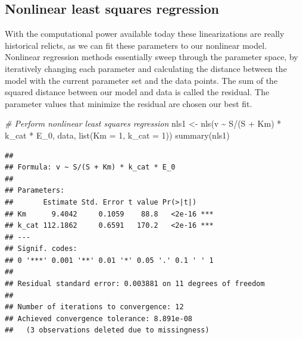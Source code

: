 \documentclass[
]{article}
\newenvironment{Shaded}{\begin{snugshade}}{\end{snugshade}}
\newcommand{\AttributeTok}[1]{\textcolor[rgb]{0.77,0.63,0.00}{#1}}
\newcommand{\CommentTok}[1]{\textcolor[rgb]{0.56,0.35,0.01}{\textit{#1}}}
\newcommand{\DecValTok}[1]{\textcolor[rgb]{0.00,0.00,0.81}{#1}}
\newcommand{\FunctionTok}[1]{\textcolor[rgb]{0.00,0.00,0.00}{#1}}
\newcommand{\NormalTok}[1]{#1}
\newcommand{\OtherTok}[1]{\textcolor[rgb]{0.56,0.35,0.01}{#1}}
\newcommand{\SpecialCharTok}[1]{\textcolor[rgb]{0.00,0.00,0.00}{#1}}
\begin{document}
\hypertarget{nonlinear-least-squares-regression}{%
\subsection{Nonlinear least squares regression}\label{nonlinear-least-squares-regression}}

With the computational power available today these linearizations are really historical relicts, as we can fit these parameters to our nonlinear model. Nonlinear regression methods essentially sweep through the parameter space, by iteratively changing each parameter and calculating the distance between the model with the current parameter set and the data points. The sum of the squared distance between our model and data is called the residual. The parameter values that minimize the residual are chosen our best fit.

\begin{Shaded}
\begin{Highlighting}[]
\CommentTok{\# Perform nonlinear least squares regression}
\NormalTok{nls1 }\OtherTok{\textless{}{-}} \FunctionTok{nls}\NormalTok{(v }\SpecialCharTok{\textasciitilde{}}\NormalTok{ S}\SpecialCharTok{/}\NormalTok{(S }\SpecialCharTok{+}\NormalTok{ Km) }\SpecialCharTok{*}\NormalTok{ k\_cat }\SpecialCharTok{*}\NormalTok{ E\_0, data, }\FunctionTok{list}\NormalTok{(}\AttributeTok{Km =} \DecValTok{1}\NormalTok{, }
    \AttributeTok{k\_cat =} \DecValTok{1}\NormalTok{))}
\FunctionTok{summary}\NormalTok{(nls1)}
\end{Highlighting}
\end{Shaded}

\begin{verbatim}
## 
## Formula: v ~ S/(S + Km) * k_cat * E_0
## 
## Parameters:
##       Estimate Std. Error t value Pr(>|t|)    
## Km      9.4042     0.1059    88.8   <2e-16 ***
## k_cat 112.1862     0.6591   170.2   <2e-16 ***
## ---
## Signif. codes:  
## 0 '***' 0.001 '**' 0.01 '*' 0.05 '.' 0.1 ' ' 1
## 
## Residual standard error: 0.003881 on 11 degrees of freedom
## 
## Number of iterations to convergence: 12 
## Achieved convergence tolerance: 8.891e-08
##   (3 observations deleted due to missingness)
\end{verbatim}
\end{document}
